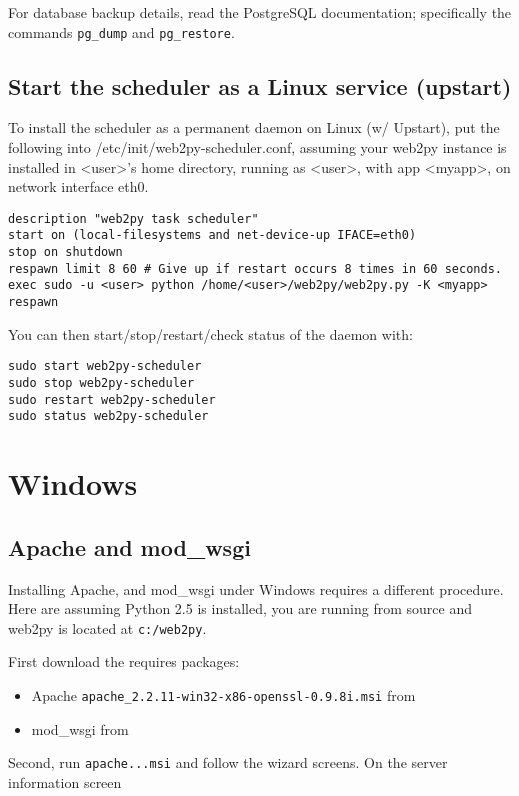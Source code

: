 \documentclass[justified,sixbynine,notoc]{tufte-book}
\def\ft{\small\tt}
\begin{document}
\begin{fullwidth}
For database backup details, read the PostgreSQL documentation; specifically the commands {\ft pg\_dump} and {\ft pg\_restore}.

\goodbreak\subsection{Start the scheduler as a Linux service (upstart)}

To install the scheduler as a permanent daemon on Linux (w/ Upstart), put the following into /etc/init/web2py-scheduler.conf, assuming your web2py instance is installed in <user>'s home directory, running as <user>, with app <myapp>, on network interface eth0.
\begin{lstlisting}
description "web2py task scheduler"
start on (local-filesystems and net-device-up IFACE=eth0)
stop on shutdown
respawn limit 8 60 # Give up if restart occurs 8 times in 60 seconds.
exec sudo -u <user> python /home/<user>/web2py/web2py.py -K <myapp>
respawn
\end{lstlisting}

You can then start/stop/restart/check status of the daemon with:
\begin{lstlisting}
sudo start web2py-scheduler
sudo stop web2py-scheduler
sudo restart web2py-scheduler
sudo status web2py-scheduler
\end{lstlisting}

\goodbreak\section{Windows}

\goodbreak\subsection{Apache and mod\_wsgi}

Installing Apache, and mod\_wsgi under Windows requires a different procedure.
Here are assuming Python 2.5 is installed, you are running from source and web2py is located at {\ft c:/web2py}.

First download the requires packages:
\begin{itemize}
\item Apache {\ft apache\_2.2.11-win32-x86-openssl-0.9.8i.msi} from ~\cite{apache1}

\item mod\_wsgi from~\cite{modwsgi1}
\end{itemize}

Second, run {\ft apache...msi} and follow the wizard screens. On the server information screen



\end{fullwidth}
\end{document}
